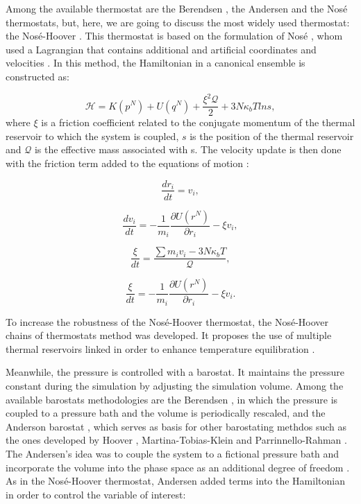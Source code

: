 Among the available thermostat are the Berendsen \cite{doi:10.1063/1.448118}, the Andersen \cite{1980JChPh722384A} and the Nos\'{e} \cite{1984JChPh81511N} thermostats, but, here, we are going to discuss the most widely used thermostat: the Nosé-Hoover \cite{PhysRevA.31.1695}. This thermostat is based on the formulation of Nosé \cite{1984JChPh81511N}, whom used a Lagrangian that contains additional and artificial coordinates and velocities \cite{frenkel}. In this method, the Hamiltonian in a canonical ensemble is constructed as:

\begin{equation}
\mathcal{H} =  K(p^{N}) + U(q^{N})  + \frac{\xi ^{2} \mathcal{Q}}{2} + 3N\kappa_{b}T ln s ,
\end{equation}
where $\xi$ is a friction coefficient related to the conjugate momentum of the thermal reservoir to which the system is coupled, $s$ is the position of the thermal reservoir and $\mathcal{Q}$ is the effective mass associated with s. The velocity update is then done with the friction term added to the equations of motion \cite{shell2015}:

\begin{equation}
\frac{dr_{i}}{dt} = v_{i},
\end{equation}

\begin{equation}
\frac{dv_{i}}{dt} = - \frac{1}{m_{i}} \frac{\partial U (r^{N})}{\partial r_{i}} - \xi v_{i},
\end{equation}

\begin{equation}
\frac{\xi}{dt} = \frac{\sum m_{i} v_{i} - 3N\kappa_{b}T}{\mathcal{Q}} ,
\end{equation}

\begin{equation}
\frac{\xi}{dt} = - \frac{1}{m_{i}} \frac{\partial U (r^{N})}{\partial r_{i}} - \xi v_{i}.
\end{equation}

To increase the robustness of the Nosé-Hoover thermostat, the Nosé-Hoover chains of thermostats method was developed. It proposes the use of multiple thermal reservoirs linked in order to enhance temperature equilibration \cite{shell2015}.  

Meanwhile, the pressure is controlled with a barostat. It maintains the pressure constant during the simulation by adjusting the simulation volume. Among the available  barostats methodologies are the Berendsen \cite{doi:10.1063/1.448118}, in which the pressure is coupled to a pressure bath and the volume is periodically rescaled, and the Anderson barostat \cite{1980JChPh722384A}, which serves as basis for other barostating methdos such as the ones developed by Hoover \cite{PhysRevA.31.1695}, Martina-Tobias-Klein \cite{doi:10.1063/1.467468} and Parrinnello-Rahman \cite{doi:10.1063/1.328693}. The Andersen's idea was to couple the system to a fictional pressure bath and  incorporate the volume into the phase space as an additional degree of freedom \cite{tuckerman}. As in the Nosé-Hoover thermostat, Andersen added terms into the Hamiltonian in order to control the variable of interest:

